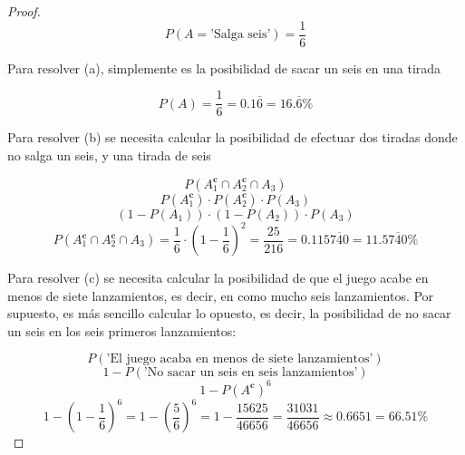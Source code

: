 \documentclass[12pt,a4paper]{article}
\begin{document}
\begin{proof}

  \begin{equation*}
    P(A = \text{'Salga seis'})=\frac{1}{6}
  \end{equation*}

  Para resolver (a), simplemente es la posibilidad de sacar un seis en una tirada

  \begin{equation*}
    P(A)=\frac{1}{6}=0.1\overline{6}=16.\overline{6}\%
  \end{equation*}

  Para resolver (b) se necesita calcular la posibilidad de efectuar dos tiradas donde no salga un seis, y una tirada de seis

  \begin{equation*}
    P(A_1^{\textbf{c}}\cap A_2^{\textbf{c}}\cap A_3)
  \end{equation*}
  \begin{equation*}
    P(A_1^{\textbf{c}})\cdot P(A_2^{\textbf{c}})\cdot P(A_3)
  \end{equation*}
  \begin{equation*}
    (1-P(A_1))\cdot (1-P(A_2))\cdot P(A_3)
  \end{equation*}
  \begin{equation*}
    P(A_1^{\textbf{c}}\cap A_2^{\textbf{c}}\cap A_3)=\frac{1}{6}\cdot (1-\frac{1}{6})^2=\frac{25}{216}=0.115\overline{740}=11.5\overline{740}\%
  \end{equation*}

  Para resolver (c) se necesita calcular la posibilidad de que el juego acabe en menos de siete lanzamientos, es decir, en como mucho seis lanzamientos. Por supuesto, es más sencillo calcular lo opuesto, es decir, la posibilidad de no sacar un seis en los seis primeros lanzamientos:

  \begin{equation*}
    P(\text{'El juego acaba en menos de siete lanzamientos'})
  \end{equation*}
  \begin{equation*}
    1-P(\text{'No sacar un seis en seis lanzamientos'})
  \end{equation*}
  \begin{equation*}
    1-P(A^{\textbf{c}})^6
  \end{equation*}
  \begin{equation*}
    1-\left(1-\frac{1}{6}\right)^6=1-\left(\frac{5}{6}\right)^6=1-\frac{15625}{46656}=\frac{31031}{46656}\approx 0.6651=66.51\%
  \end{equation*}

\end{proof}
\end{document}
